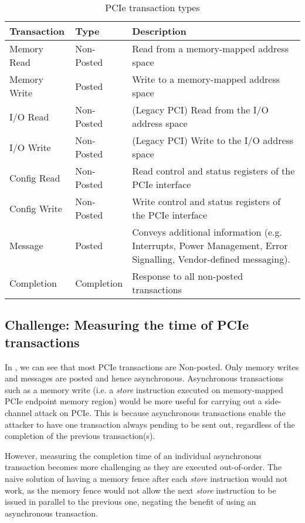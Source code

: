 \begin{table}[htb]
    \centering
    \begin{tabular}{|l|l|p{}|}
        \hline
        \textbf{Transaction} & \textbf{Type} & \textbf{Description} \\ 
        \hline
        Memory Read  & Non-Posted & Read from a memory-mapped address space \\ 
        Memory Write & Posted     & Write to a memory-mapped address space  \\ 
        I/O Read     & Non-Posted & (Legacy PCI) Read from the I/O address space \\ 
        I/O Write    & Non-Posted & (Legacy PCI) Write to the I/O address space \\ 
        Config Read  & Non-Posted & Read control and status registers of the PCIe interface \\ 
        Config Write & Non-Posted & Write control and status registers of the PCIe interface \\  
        Message      & Posted     & Conveys additional information (e.g. Interrupts, Power Management, Error Signalling, Vendor-defined messaging). \\
        Completion   & Completion & Response to all non-posted transactions \\ 
        \hline
    \end{tabular}
    \caption{PCIe transaction types}
    \label{tab:pcie-transaction-types}
\end{table}


\subsection{Challenge: Measuring the time of PCIe transactions}

In , we can see that most PCIe transactions are Non-posted.
Only memory writes and messages are posted and hence asynchronous.
Asynchronous transactions such as a memory write (i.e. a \textit{store} instruction executed on memory-mapped PCIe endpoint memory region) would be more useful for carrying out a side-channel attack on PCIe.
This is because asynchronous transactions enable the attacker to have one transaction always pending to be sent out, regardless of the completion of the previous transaction(s).

However, measuring the completion time of an individual asynchronous transaction becomes more challenging as they are executed out-of-order. 
The naive solution of having a memory fence after each \textit{store} instruction would not work, as the memory fence would not allow the next \textit{store} instruction to be issued in parallel to the previous one, negating the benefit of using an asynchronous transaction.

\endinput




https://www.linkedin.com/pulse/pci-express-primer-3-transaction-layer-simon-southwell/